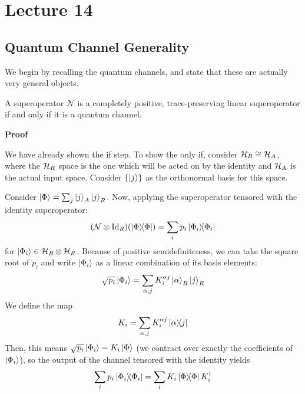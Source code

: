 \section{Lecture 14}

\subsection{Quantum Channel Generality}

We begin by recalling the quantum channels, and state that these are actually very general objects.

\begin{theorem}
    A superoperator $\mathcal{N}$
    is a completely positive, trace-preserving linear superoperator if and only if it is a quantum channel.

    \textbf{Proof} %

    We have already shown the if step. To show the only if,
    consider $\mathcal{H}_R \cong \operatorname{\mathcal{H}}_A$, where the $\operatorname{\mathcal{H}}_R$ space is the one
    which will be acted on by the identity and $\operatorname{\mathcal{H}}_A$ is the actual input space.
    Consider $\{\ket{j}\}$ as the orthonormal basis for this space.

    Consider $\ket{\Phi} = \sum_j \ket{j}_A \ket{j}_R$. Now, applying the superoperator tensored with the identity superoperator:
    \[ \qty(\mathcal{N} \otimes \textrm{Id}_R)\qty(\ketbra{\Phi}) = \sum_i p_i \ketbra{\Phi_i} \]
    for $\ket{\Phi_i} \in \operatorname{\mathcal{H}}_B \otimes \operatorname{\mathcal{H}}_R$. Because of positive semidefiniteness, we can take the square root of $p_i$
    and write $\ket{\Phi_i}$ as a linear combination of its basis elements:
    \[ \sqrt{p_i} \ket{\Phi_i} = \sum_{\alpha, j} K_i^{\alpha j} \ket{\alpha}_B \ket{j}_R \]
    We define the map
    \[ K_i = \sum_{\alpha, j} K_i^{\alpha j} \ketbra{\alpha}{j} \]
    Then, this means $\sqrt{p_i} \ket{\Phi_i} = K_i \ket{\Phi}$ (we contract over exactly the coefficients of $\ket{\Phi_i}$),
    so the output of the channel tensored with the identity yields
    \[ \sum_i p_i \ketbra{\Phi_i} = \sum_i K_i \ketbra{\Phi} K_i^{\dagger} \]


\end{theorem}
